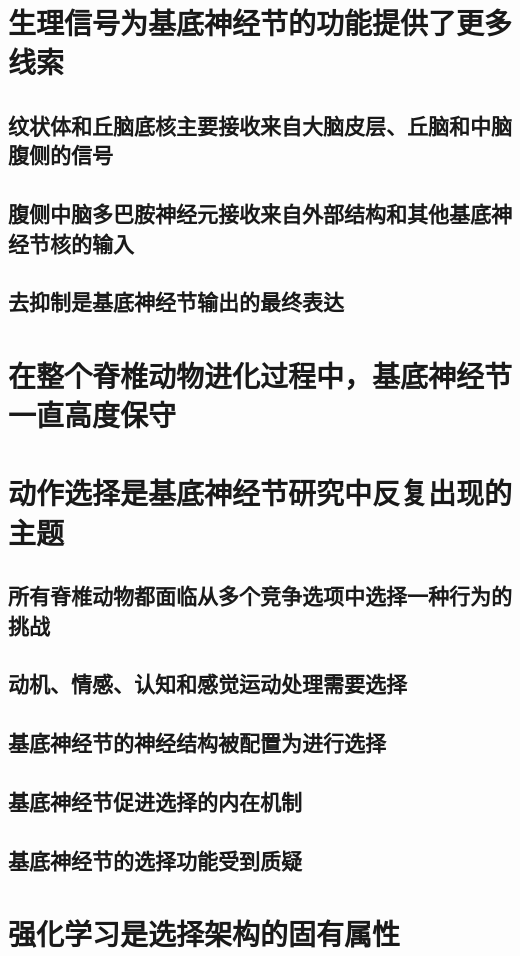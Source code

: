 \section{生理信号为基底神经节的功能提供了更多线索}
\subsection{纹状体和丘脑底核主要接收来自大脑皮层、丘脑和中脑腹侧的信号}
\subsection{腹侧中脑多巴胺神经元接收来自外部结构和其他基底神经节核的输入}
\subsection{去抑制是基底神经节输出的最终表达}

\section{在整个脊椎动物进化过程中，基底神经节一直高度保守}

\section{动作选择是基底神经节研究中反复出现的主题}
\subsection{所有脊椎动物都面临从多个竞争选项中选择一种行为的挑战}
\subsection{动机、情感、认知和感觉运动处理需要选择}
\subsection{基底神经节的神经结构被配置为进行选择}
\subsection{基底神经节促进选择的内在机制}
\subsection{基底神经节的选择功能受到质疑}

\section{强化学习是选择架构的固有属性}
